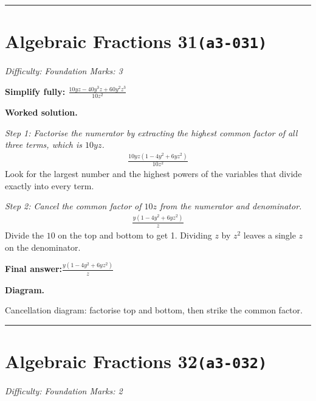\documentclass[11pt]{article}
\newcommand{\question}[1]{\par\medskip\noindent\textbf{#1}\par}
\begin{document}
\medskip\hrule

\section*{Algebraic Fractions 31\quad\small\texttt{(a3-031)}}
\textit{Difficulty: Foundation \quad\textbar\quad Marks: 3}

\question{Simplify fully: \( \frac{10yz - 40y^3z + 60y^2z^3}{10z^2} \)}

\textbf{Worked solution.}

\textit{Step 1: Factorise the numerator by extracting the highest common factor of all three terms, which is \( 10yz \).}
\[\begin{gathered}
\frac{10yz(1 - 4y^2 + 6yz^2)}{10z^2}
\end{gathered}\]
Look for the largest number and the highest powers of the variables that divide exactly into every term.

\textit{Step 2: Cancel the common factor of \( 10z \) from the numerator and denominator.}
\[\begin{gathered}
\frac{y(1 - 4y^2 + 6yz^2)}{z}
\end{gathered}\]
Divide the \( 10 \) on the top and bottom to get 1. Dividing \( z \) by \( z^2 \) leaves a single \( z \) on the denominator.

\begin{answerbox}
\textbf{Final answer:}\quad \(\displaystyle \frac{y(1 - 4y^2 + 6yz^2)}{z}\)
\end{answerbox}
\textbf{Diagram.}

\begin{center}
\end{center}
\small Cancellation diagram: factorise top and bottom, then strike the common factor.\normalsize

\medskip\hrule

\section*{Algebraic Fractions 32\quad\small\texttt{(a3-032)}}
\textit{Difficulty: Foundation \quad\textbar\quad Marks: 2}
\end{document}
